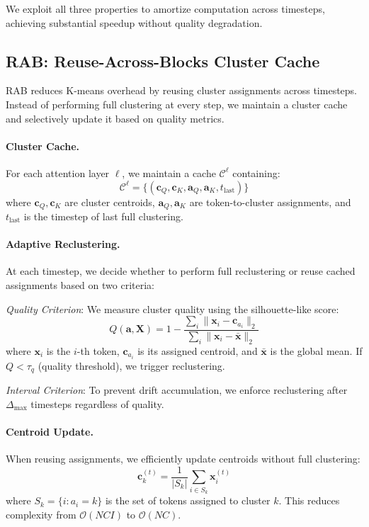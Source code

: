 We exploit all three properties to amortize computation across timesteps, achieving substantial speedup without quality degradation.

\subsection{RAB: Reuse-Across-Blocks Cluster Cache}
\label{sec:ctca}

RAB reduces K-means overhead by reusing cluster assignments across timesteps. Instead of performing full clustering at every step, we maintain a cluster cache and selectively update it based on quality metrics.

\paragraph{Cluster Cache.}
For each attention layer $\ell$, we maintain a cache $\mathcal{C}^\ell$ containing:
\begin{equation}
    \mathcal{C}^\ell = \{(\mathbf{c}_Q, \mathbf{c}_K, \mathbf{a}_Q, \mathbf{a}_K, t_{\text{last}})\}
\end{equation}
where $\mathbf{c}_Q, \mathbf{c}_K$ are cluster centroids, $\mathbf{a}_Q, \mathbf{a}_K$ are token-to-cluster assignments, and $t_{\text{last}}$ is the timestep of last full clustering.

\paragraph{Adaptive Reclustering.}
At each timestep, we decide whether to perform full reclustering or reuse cached assignments based on two criteria:

\textit{Quality Criterion}: We measure cluster quality using the silhouette-like score:
\begin{equation}
    Q(\mathbf{a}, \mathbf{X}) = 1 - \frac{\sum_{i} \|\mathbf{x}_i - \mathbf{c}_{a_i}\|_2}{\sum_{i} \|\mathbf{x}_i - \bar{\mathbf{x}}\|_2}
\end{equation}
where $\mathbf{x}_i$ is the $i$-th token, $\mathbf{c}_{a_i}$ is its assigned centroid, and $\bar{\mathbf{x}}$ is the global mean. If $Q < \tau_q$ (quality threshold), we trigger reclustering.

\textit{Interval Criterion}: To prevent drift accumulation, we enforce reclustering after $\Delta_{\max}$ timesteps regardless of quality.

\paragraph{Centroid Update.}
When reusing assignments, we efficiently update centroids without full clustering:
\begin{equation}
    \mathbf{c}_k^{(t)} = \frac{1}{|S_k|} \sum_{i \in S_k} \mathbf{x}_i^{(t)}
\end{equation}
where $S_k = \{i : a_i = k\}$ is the set of tokens assigned to cluster $k$. This reduces complexity from $\mathcal{O}(NCI)$ to $\mathcal{O}(NC)$.

